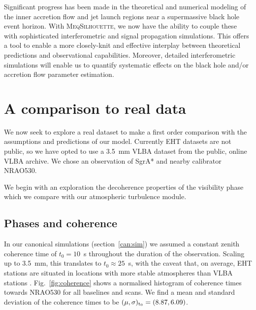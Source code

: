 Significant progress has been made in the theoretical and numerical modeling of the inner accretion flow and jet launch regions near a supermassive black hole event horizon. With \textsc{MeqSilhouette}, we now have the ability to couple these with sophisticated interferometric and signal propagation simulations. This offers a tool to enable a more closely-knit and effective interplay between theoretical predictions and observational capabilities. Moreover, detailed interferometric simulations will enable us to quantify systematic effects on the black hole and/or accretion flow parameter estimation.
 

\section{A comparison to real data}

We now seek to explore a real dataset to make a first order comparison with the assumptions and predictions of our model. Currently EHT datasets are not public, so we have opted to use a 3.5~mm VLBA dataset from the public, online VLBA archive. We chose an observation of SgrA* and nearby calibrator NRAO530. 

We begin with an exploration the decoherence properties of the visibility phase which we compare with our atmospheric turbulence module. 


\subsection{Phases and coherence}

In our canonical simulations (section~\ref{can:sim}) we assumed a constant zenith coherence time of $t_0 = 10$~s throughout the duration of the observation.  Scaling up to 3.5~mm, this translates to $t_0 \approx 25$~s, with the caveat that, on average, EHT stations are situated in locations with more stable atmospheres than VLBA stations . Fig.~\ref{fig:coherence} shows a normalised histogram of coherence times towards NRAO530 for all baselines and scans. We find a mean and standard deviation of the coherence times to be $(\mu, \sigma)_{\rm t_0} = (8.87,6.09)$.

